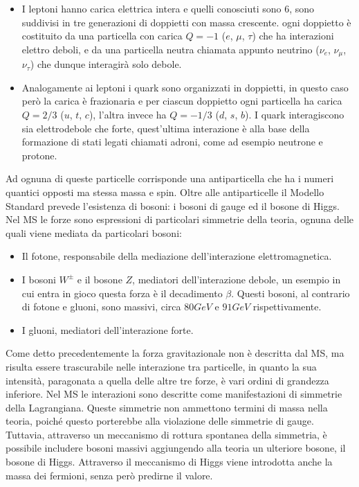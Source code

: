 \begin{itemize}
\item I leptoni hanno carica elettrica intera e quelli conosciuti sono 6, sono suddivisi in tre generazioni di doppietti con massa crescente. ogni doppietto è costituito da una particella con carica $Q=-1$ ($e$, $\mu$, $\tau$) che ha interazioni elettro deboli, e da una particella neutra chiamata appunto neutrino ($\nu_e$, $\nu_{\mu}$, $\nu_{\tau}$) che dunque interagirà solo debole.

\item Analogamente ai leptoni i quark sono organizzati in doppietti, in questo caso però la carica è frazionaria e per ciascun doppietto ogni particella ha carica $Q=2/3$ ($u$, $t$, $c$), l'altra invece ha $Q=-1/3$ ($d$, $s$, $b$). I quark interagiscono sia elettrodebole che forte, quest'ultima interazione è alla base della formazione di stati legati chiamati adroni, come ad esempio neutrone e protone.
\end{itemize}

Ad ognuna di queste particelle corrisponde una antiparticella che ha i numeri quantici opposti ma stessa massa e spin. Oltre alle antiparticelle il Modello Standard prevede l'esistenza di bosoni: i bosoni di gauge ed il bosone di Higgs. 
Nel MS le forze sono espressioni di particolari simmetrie della teoria, ognuna delle quali viene mediata da particolari bosoni:

\begin{itemize}
\item Il fotone, responsabile della mediazione dell'interazione elettromagnetica.

\item I bosoni $W^{\pm}$ e il bosone $Z$, mediatori dell'interazione debole, un esempio in cui entra in gioco questa forza è il decadimento $\beta$. Questi bosoni, al contrario di fotone e gluoni, sono massivi, circa $80 GeV$ e $91 GeV$ rispettivamente.

\item I gluoni, mediatori dell'interazione forte.
\end{itemize}

Come detto precedentemente la forza gravitazionale non è descritta dal MS, ma risulta essere trascurabile nelle interazione tra particelle, in quanto la sua intensità, paragonata a quella delle altre tre forze, è vari ordini di grandezza inferiore. Nel MS le interazioni sono descritte come manifestazioni di simmetrie della Lagrangiana. 
Queste simmetrie non ammettono termini di massa nella teoria, poiché questo porterebbe alla violazione delle
simmetrie di gauge. Tuttavia, attraverso un meccanismo di rottura spontanea della
simmetria, è possibile includere bosoni massivi aggiungendo alla teoria un ulteriore bosone, il bosone di Higgs. 
Attraverso il meccanismo di Higgs viene introdotta anche la massa dei fermioni, senza però predirne il valore.


